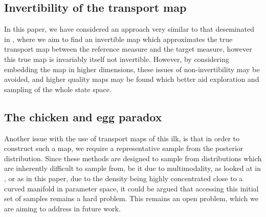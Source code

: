 \documentclass[final]{siamltex}
\begin{document}
\subsection{Invertibility of the transport map}
In this paper, we have considered an approach very similar to that
deseminated in \cite{parno2014transport}, where we aim to find an
invertible map which approximates the true transport map between the
reference measure and the target measure, however this true map is
invariably itself not invertible. However, by considering embedding
the map in higher dimensions\cite{whitney_self-intersections_1994,nash1956imbedding,takens_detecting_1981}, these issues of non-invertibility may be
avoided, and higher quality maps may be found which better aid
exploration and sampling of the whole state space.

\subsection{The chicken and egg paradox}
Another issue with the use of transport maps of this ilk, is that in
order to construct such a map, we require a representative sample from
the posterior distribution. Since these methods are designed to sample
from distributions which are inherently difficult to sample from, be
it due to multimodality, as looked at in \cite{cotter2015parallel}, or
as in this paper, due to the density being highly concentrated close
to a curved manifold in parameter space, it could be argued that accessing this initial set of
samples remains a hard problem. This remains an open problem, which we
are aiming to address in future work.




\end{document}
